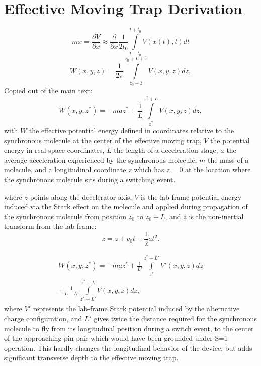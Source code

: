 \documentclass[%
 reprint,
 amsmath,amssymb,
 aps,
prl,
]{revtex4-1}
\begin{document}
\section{Effective Moving Trap Derivation}
\label{app:effpot}
\begin{equation}
m\ddot{x}=\frac{\partial V}{\partial x}\approx \frac{\partial}{\partial x}\frac{1}{2t_0}\int\limits_{t-t_0}^{t+t_0}V(x(t),t)dt
\end{equation}
\begin{equation}
W(x,y,\bar{z}) = \frac{1}{2\pi}\int\limits_{z_0+\bar{z}}^{z_0+L+\bar{z}}V(x,y,z)dz, 
\end{equation}
Copied out of the main text:
\begin{equation}
W(x,y,z^*) = - maz^* + \frac{1}{L}\int\limits_{z^*}^{z^*+L}V(x,y,z) dz,
\end{equation}
with $W$ the effective potential energy defined in coordinates relative to the synchronous molecule at the center of the effective moving trap, $V$ the potential energy in real space coordinates, $L$ the length of a deceleration stage, $a$ the average acceleration experienced by the synchronous molecule, $m$ the mass of a molecule, and a longitudinal coordinate $z$ which has $z=0$ at the location where the synchronous molecule sits during a switching event.

where $z$ points along the decelerator axis, $V$ is the lab-frame potential energy induced via the Stark effect on the molecule and applied during propagation of the synchronous molecule from position $z_0$ to $z_0+L$, and $\bar{z}$ is the non-inertial transform from the lab-frame: 
\begin{equation}
\bar{z} = z + v_0 t - \frac{1}{2}a t^2.
\end{equation}

\begin{multline}
W(x,y,z^*) = - maz^* + 
\frac{1}{L'}\!\!\int\limits_{z^*}^{z^*+L'}\!\!V'(x,y,z) dz \\
+\frac{1}{L-L'}\!\!\int\limits_{z^*+L'}^{z^*+L}\!\!V(x,y,z) dz,\hspace{2cm}
\end{multline}
where $V'$ represents the lab-frame Stark potential induced by the alternative charge configuration, and $L'$ gives twice the distance required for the synchronous molecule to fly from its longitudinal position during a switch event, to the center of the approaching pin pair which would have been grounded under S=1 operation. This hardly changes the longitudinal behavior of the device, but adds significant transverse depth to the effective moving trap.
\end{document}
